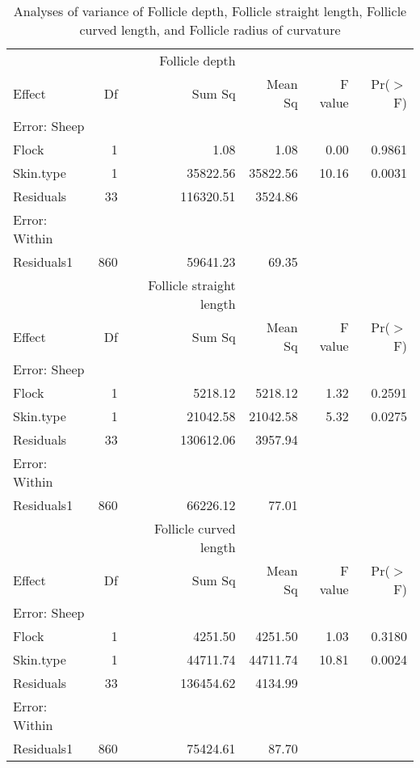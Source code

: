 \label{tab:aov}
\begin{table}[ht]
\centering
\caption{Analyses of variance of Follicle depth, Follicle straight length, Follicle curved length, and Follicle radius of curvature}
\begin{tabular}{lrrrrr}
  \hline
 & & Follicle depth & & & \\
 Effect & Df & Sum Sq & Mean Sq & F value & Pr($>$F) \\ 
  \hline
  Error: Sheep & & & & &  \\
Flock     & 1 & 1.08 & 1.08 & 0.00 & 0.9861 \\ 
  Skin.type & 1 & 35822.56 & 35822.56 & 10.16 & 0.0031 \\ 
  Residuals & 33 & 116320.51 & 3524.86 &  &  \\ 
  Error: Within & & & & &  \\
  Residuals1 & 860 & 59641.23 & 69.35 &  &  \\ 
   \hline

 & & Follicle straight length & & & \\
 Effect & Df & Sum Sq & Mean Sq & F value & Pr($>$F) \\ 
  \hline
  Error: Sheep & & & & &  \\
Flock     & 1 & 5218.12 & 5218.12 & 1.32 & 0.2591 \\ 
  Skin.type & 1 & 21042.58 & 21042.58 & 5.32 & 0.0275 \\ 
  Residuals & 33 & 130612.06 & 3957.94 &  &  \\ 
  Error: Within & & & & &  \\
  Residuals1 & 860 & 66226.12 & 77.01 &  &  \\ 
   \hline

 & & Follicle curved length & & & \\
 Effect & Df & Sum Sq & Mean Sq & F value & Pr($>$F) \\ 
  \hline
  Error: Sheep & & & & &  \\
Flock     & 1 & 4251.50 & 4251.50 & 1.03 & 0.3180 \\ 
  Skin.type & 1 & 44711.74 & 44711.74 & 10.81 & 0.0024 \\ 
  Residuals & 33 & 136454.62 & 4134.99 &  &  \\ 
  Error: Within & & & & &  \\
  Residuals1 & 860 & 75424.61 & 87.70 &  &  \\ 
   \hline


\end{tabular}
\end{table}
